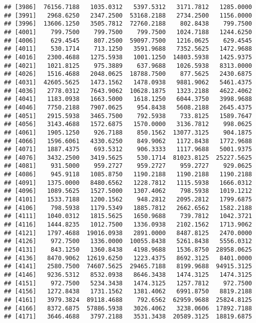 \documentclass[]{article}
\begin{document}
\begin{verbatim}
## [3986]  76156.7188   1035.0312   5397.5312   3171.7812   1285.0000
## [3991]   2968.6250   2347.2500  53168.2188   2734.2500   1156.0000
## [3996]  13606.1250   3505.7812  72760.2188    802.8438    799.7500
## [4001]    799.7500    799.7500    799.7500   1024.7188   1244.6250
## [4006]    629.4545    807.2500  59097.7500   1216.0625    629.4545
## [4011]    530.1714    713.1250   3591.9688   7352.5625   1472.9688
## [4016]   2300.4688   1275.5938   1001.1250  14803.5938   1425.9375
## [4021]   1021.8125    975.3889    637.9688   1026.5938   8313.0000
## [4026]   1516.4688   2048.0625  18788.7500    877.5625   2430.6875
## [4031]  42605.5625   1473.1562   1478.0938   9881.9062   5461.4375
## [4036]   2778.0312   7643.9062  10628.1875   1323.2188   4622.4062
## [4041]   1183.0938   1663.5000   1618.1250   6044.3750   3998.9688
## [4046]   7750.2188   7907.0625    954.8438   5608.2188   2645.4375
## [4051]   2915.5938   3465.7500    792.5938    733.8125   1589.7647
## [4056]   3143.4688   1572.6875   1570.0000   3136.7812    998.0625
## [4061]   1905.1250    926.7188    850.1562  13077.3125    904.1875
## [4066]   1596.6061   4330.6250    849.9062   1172.8438   1772.9688
## [4071]   1887.4375    693.5312    906.3333   1117.9688   5001.9375
## [4076]   3432.2500   3419.5625    530.1714  81023.8125  25227.5625
## [4081]    931.5000    959.2727    959.2727    959.2727    929.0625
## [4086]    945.9118   1085.8750   1190.2188   1190.2188   1190.2188
## [4091]   1375.0000   8480.6562   1228.7812   1115.5938   1666.0312
## [4096]   1089.5625   1527.5000   1307.4062    798.5938   1019.1212
## [4101]   1533.7188   1200.1562    948.2812   2095.2812   1799.6875
## [4106]    798.5938   1179.5349   1885.7812   2662.6562   1582.2188
## [4111]   1040.0312   1815.5625   1650.9688    739.7812   1042.3721
## [4116]   1444.8235   1012.7500   1336.0938   2102.1562   1713.9062
## [4121]   1797.4688  19016.0938   2891.0000   8487.8125   2470.0000
## [4126]    972.7500   1336.0000  10055.8438   5261.8438   5556.0312
## [4131]    843.1250   1360.8438   4198.9688   1536.8750  28958.0625
## [4136]   8470.9062  12619.6250   1223.4375   8692.3125   8401.0000
## [4141]   2580.7500  74607.5625  29465.7188   8199.9688  94915.3125
## [4146]   9236.5312   8532.0938   8646.3438   1474.3125   1474.3125
## [4151]    972.7500   5234.3438   1474.3125   1257.7812    972.7500
## [4156]   1272.8438   1731.1562   1381.4062   6991.8750   8819.2188
## [4161]   3979.3824  89118.4688    792.6562  62959.9688  25824.8125
## [4166]   8372.6875  57886.5938   3026.4062   3238.0606  17892.7188
## [4171]   3646.4688   3797.2188   3531.3438  20589.3125  18819.6875

\end{verbatim}
\end{document}
